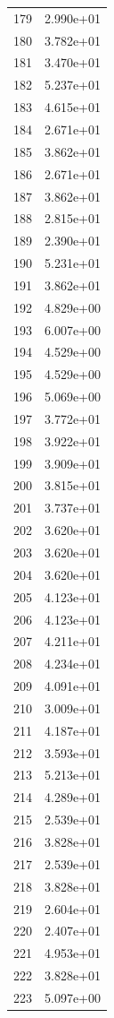 \documentclass[12pt]{article}
\begin{document}
\begin{longtable}{@{}cc@{}}
179 & 2.990e+01 \\
180 & 3.782e+01 \\
181 & 3.470e+01 \\
182 & 5.237e+01 \\
183 & 4.615e+01 \\
184 & 2.671e+01 \\
185 & 3.862e+01 \\
186 & 2.671e+01 \\
187 & 3.862e+01 \\
188 & 2.815e+01 \\
189 & 2.390e+01 \\
190 & 5.231e+01 \\
191 & 3.862e+01 \\
192 & 4.829e+00 \\
193 & 6.007e+00 \\
194 & 4.529e+00 \\
195 & 4.529e+00 \\
196 & 5.069e+00 \\
197 & 3.772e+01 \\
198 & 3.922e+01 \\
199 & 3.909e+01 \\
200 & 3.815e+01 \\
201 & 3.737e+01 \\
202 & 3.620e+01 \\
203 & 3.620e+01 \\
204 & 3.620e+01 \\
205 & 4.123e+01 \\
206 & 4.123e+01 \\
207 & 4.211e+01 \\
208 & 4.234e+01 \\
209 & 4.091e+01 \\
210 & 3.009e+01 \\
211 & 4.187e+01 \\
212 & 3.593e+01 \\
213 & 5.213e+01 \\
214 & 4.289e+01 \\
215 & 2.539e+01 \\
216 & 3.828e+01 \\
217 & 2.539e+01 \\
218 & 3.828e+01 \\
219 & 2.604e+01 \\
220 & 2.407e+01 \\
221 & 4.953e+01 \\
222 & 3.828e+01 \\
223 & 5.097e+00 \\

\end{longtable}
\end{document}
